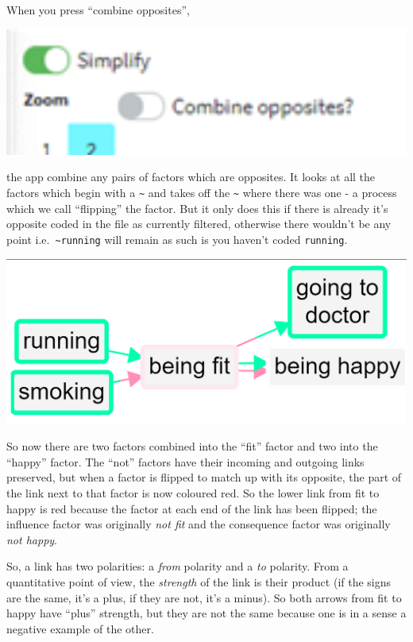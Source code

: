 \documentclass[
]{book}
\begin{document}
When you press ``combine opposites'',

\hspace{0pt} \includegraphics[width=6.77083in,height=\textheight]{_assets/image-20210115221340684.png}

the app combine any pairs of factors which are opposites. It looks at all the factors which begin with a \texttt{\textasciitilde{}} and takes off the \texttt{\textasciitilde{}} where there was one - a process which we call ``flipping'' the factor. But it only does this if there is already it's opposite coded in the file as currently filtered, otherwise there wouldn't be any point i.e.~\texttt{\textasciitilde{}running} will remain as such is you haven't coded \texttt{running}.

\includegraphics{_assets/121008.png}

So now there are two factors combined into the ``fit'' factor and two into the ``happy'' factor. The ``not'' factors have their incoming and outgoing links preserved, but when a factor is flipped to match up with its opposite, the part of the link next to that factor is now coloured red. So the lower link from fit to happy is red because the factor at each end of the link has been flipped; the influence factor was originally \emph{not fit} and the consequence factor was originally \emph{not happy}.

So, a link has two polarities: a \emph{from} polarity and a \emph{to} polarity. From a quantitative point of view, the \emph{strength} of the link is their product (if the signs are the same, it's a plus, if they are not, it's a minus). So both arrows from fit to happy have ``plus'' strength, but they are not the same because one is in a sense a negative example of the other.
\end{document}
